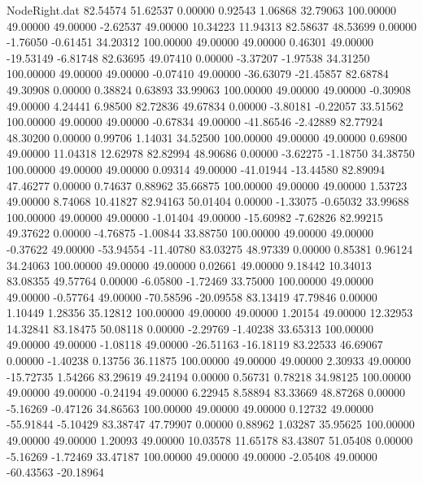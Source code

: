 \begin{filecontents}{NodeRight.dat}
  82.54574   51.62537    0.00000     0.92543    1.06868   32.79063  100.00000   49.00000   49.00000   -2.62537   49.00000   10.34223   11.94313
  82.58637   48.53699    0.00000    -1.76050   -0.61451   34.20312  100.00000   49.00000   49.00000    0.46301   49.00000  -19.53149   -6.81748
  82.63695   49.07410    0.00000    -3.37207   -1.97538   34.31250  100.00000   49.00000   49.00000   -0.07410   49.00000  -36.63079  -21.45857
  82.68784   49.30908    0.00000     0.38824    0.63893   33.99063  100.00000   49.00000   49.00000   -0.30908   49.00000    4.24441    6.98500
  82.72836   49.67834    0.00000    -3.80181   -0.22057   33.51562  100.00000   49.00000   49.00000   -0.67834   49.00000  -41.86546   -2.42889
  82.77924   48.30200    0.00000     0.99706    1.14031   34.52500  100.00000   49.00000   49.00000    0.69800   49.00000   11.04318   12.62978
  82.82994   48.90686    0.00000    -3.62275   -1.18750   34.38750  100.00000   49.00000   49.00000    0.09314   49.00000  -41.01944  -13.44580
  82.89094   47.46277    0.00000     0.74637    0.88962   35.66875  100.00000   49.00000   49.00000    1.53723   49.00000    8.74068   10.41827
  82.94163   50.01404    0.00000    -1.33075   -0.65032   33.99688  100.00000   49.00000   49.00000   -1.01404   49.00000  -15.60982   -7.62826
  82.99215   49.37622    0.00000    -4.76875   -1.00844   33.88750  100.00000   49.00000   49.00000   -0.37622   49.00000  -53.94554  -11.40780
  83.03275   48.97339    0.00000     0.85381    0.96124   34.24063  100.00000   49.00000   49.00000    0.02661   49.00000    9.18442   10.34013
  83.08355   49.57764    0.00000    -6.05800   -1.72469   33.75000  100.00000   49.00000   49.00000   -0.57764   49.00000  -70.58596  -20.09558
  83.13419   47.79846    0.00000     1.10449    1.28356   35.12812  100.00000   49.00000   49.00000    1.20154   49.00000   12.32953   14.32841
  83.18475   50.08118    0.00000    -2.29769   -1.40238   33.65313  100.00000   49.00000   49.00000   -1.08118   49.00000  -26.51163  -16.18119
  83.22533   46.69067    0.00000    -1.40238    0.13756   36.11875  100.00000   49.00000   49.00000    2.30933   49.00000  -15.72735    1.54266
  83.29619   49.24194    0.00000     0.56731    0.78218   34.98125  100.00000   49.00000   49.00000   -0.24194   49.00000    6.22945    8.58894
  83.33669   48.87268    0.00000    -5.16269   -0.47126   34.86563  100.00000   49.00000   49.00000    0.12732   49.00000  -55.91844   -5.10429
  83.38747   47.79907    0.00000     0.88962    1.03287   35.95625  100.00000   49.00000   49.00000    1.20093   49.00000   10.03578   11.65178
  83.43807   51.05408    0.00000    -5.16269   -1.72469   33.47187  100.00000   49.00000   49.00000   -2.05408   49.00000  -60.43563  -20.18964

\end{filecontents}
